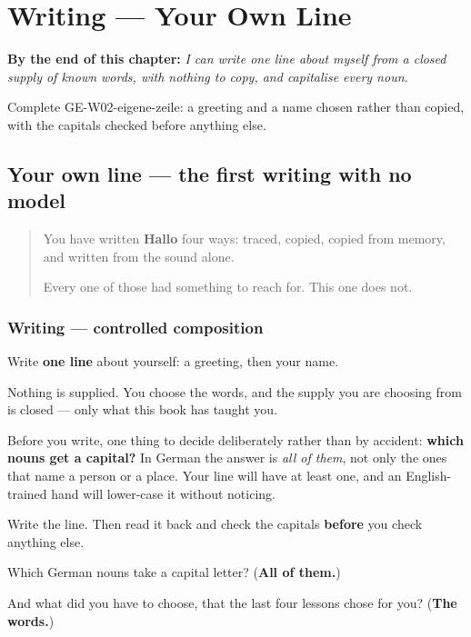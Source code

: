 
\chapter{Writing --- Your Own Line}
\label{ch:ge-eigene-zeile}

\begin{chapteropening}
\textbf{By the end of this chapter:} \emph{I can write one line about myself from a closed supply of known words, with nothing to copy, and capitalise every noun.}

Complete GE-W02-eigene-zeile: a greeting and a name chosen rather than copied, with the capitals checked before anything else.
\end{chapteropening}

\section[(eigene Zeile)]{Your own line — the first writing with no model}

\label{lesson:GE-W02-eigene-zeile}



\begin{quote}
You have written \textbf{Hallo} four ways: traced, copied, copied from memory, and written from the sound alone.

Every one of those had something to reach for. This one does not.
\end{quote}

\subsection*{Writing — controlled composition}
Write \textbf{one line} about yourself: a greeting, then your name.

Nothing is supplied. You choose the words, and the supply you are choosing from is closed — only what this book has taught you.

Before you write, one thing to decide deliberately rather than by accident: \textbf{which nouns get a capital?} In German the answer is \emph{all of them}, not only the ones that name a person or a place. Your line will have at least one, and an English-trained hand will lower-case it without noticing.

Write the line. Then read it back and check the capitals \textbf{before} you check anything else.

\begin{tcolorbox}[breakable,colback=teal!4,colframe=teal!35!black,title={Before you move on}]
Which German nouns take a capital letter? (\textbf{All of them.})

And what did you have to choose, that the last four lessons chose for you? (\textbf{The words.})
\end{tcolorbox}
